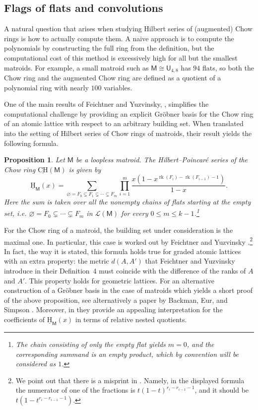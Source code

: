 \documentclass[11pt, a4paper, english]{amsart}
\theoremstyle{teoremas}
\newtheorem{proposition}[theorem]{Proposition}
\theoremstyle{definition}
\DeclareMathOperator{\rk}{rk}
\newcommand{\M}{\mathsf{M}}
\newcommand{\U}{\mathsf{U}}
\newcommand{\uH}{\underline{\mathrm{H}}}
\newcommand{\uCH}{\underline{\mathrm{CH}}}
\begin{document}
\subsection{Flags of flats and convolutions}

A natural question that arises when studying Hilbert series of (augmented) Chow rings is how to actually compute them. A naive approach is to compute the polynomials by constructing the full ring from the definition, 
but the computational cost of this method is excessively high for all
but the smallest matroids.
For example, a small matroid such as $\M\cong\U_{4,8}$ has $94$ flats, so both the Chow ring and the augmented Chow ring are defined as a quotient of a polynomial ring with nearly $100$ variables. 

One of the main results of Feichtner and Yuzvinsky, \cite[Proposition~1]{feichtner-yuzvinsky}, simplifies the computational challenge by providing an explicit Gr\"obner basis for the Chow ring of an atomic lattice with respect to an arbitrary building set. When translated into the setting of Hilbert series of Chow rings of matroids, their result yields the following formula.

\begin{proposition}\label{prop:hilbert-chow}
    Let $\M$ be a loopless matroid. The Hilbert--Poincar\'e series of the Chow ring $\uCH(\M)$ is given by
        \[ \uH_{\M}(x) = \sum_{\varnothing = F_0 \subsetneq F_1 \subsetneq \cdots \subsetneq F_m} \prod_{i=1}^m \frac{x ( 1 - x^{\rk(F_i)-\rk(F_{i-1})-1})}{1-x}.\]
    Here the sum is taken over all the nonempty chains of flats starting at the empty set, i.e. $\varnothing = F_0\subsetneq \cdots \subsetneq F_m $ in $\mathcal{L}(\M)$ for every $0\leq m\leq k-1$.\footnote{The chain consisting of only the empty flat yields $m=0$, and the corresponding summand is an empty product, which by convention will be considered as $1$.}
\end{proposition}

For the Chow ring of a matroid, the building set under consideration is the maximal one. In particular, this case is worked out by Feichtner and Yuzvinsky \cite[p.~526]{feichtner-yuzvinsky}.\footnote{We point out that there is a misprint in \cite[p.~526]{feichtner-yuzvinsky}. Namely, in the displayed formula the numerator of one of the fractions is $t(1-t)^{r_i-r_{i-1}-1}$, and it should be $t(1-t^{r_i-r_{i-1}-1})$.} In fact, the way it is stated, this formula holds true for graded atomic lattices with an extra property: the metric $d(A,A')$ that Feichtner and Yuzvinsky introduce in their Definition~4 must coincide with the difference of the ranks of $A$ and $A'$. This property holds for geometric lattices. For an alternative construction of a Gr\"obner basis in the case of matroids which yields a short proof of the above proposition, see alternatively a paper by Backman, Eur, and Simpson \cite[Corollary 3.3.3]{backman-eur-simpson}. Moreover, in \cite[Theorem 3.3.8]{backman-eur-simpson} they provide an appealing interpretation for the coefficients of $\uH_{\M}(x)$ in terms of relative nested quotients.
\end{document}
